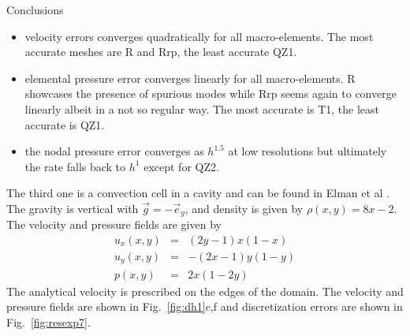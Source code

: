 \documentclass[a4paper,12pt]{article}
\begin{document}
Conclusions
\begin{itemize}
\item velocity errors converges quadratically for all macro-elements.
The most accurate meshes are R and Rrp, the least accurate QZ1.
\item elemental pressure error converges linearly for all macro-elements. R 
showcases the presence of spurious modes while Rrp seems again to converge linearly
albeit in a not so regular way. 
The most accurate is T1, the least accurate is QZ1.
\item the nodal pressure error converges as $h^{1.5}$ at low resolutions but ultimately 
the rate falls back to $h^1$ except for QZ2. 
\end{itemize}


The third one is a convection cell in a cavity and can be found in Elman et al \cite{elsw}.
The gravity is vertical with $\vec{g}=-\vec{e}_y$, and 
density is given by $\rho(x,y)=8x-2$. The velocity and pressure fields are given by
\begin{eqnarray}
u_x(x,y) &=&  (2y-1)x(1-x) \\
u_y(x,y) &=& - (2x-1)y(1-y) \\
p(x,y) &=& 2x(1 - 2y)
\end{eqnarray}
The analytical velocity is prescribed on the edges of the domain. 
The velocity and pressure fields are shown in Fig.~\ref{fig:dh1}c,f
and discretization errors are shown in Fig.~\ref{fig:resexp7}.
\end{document}
